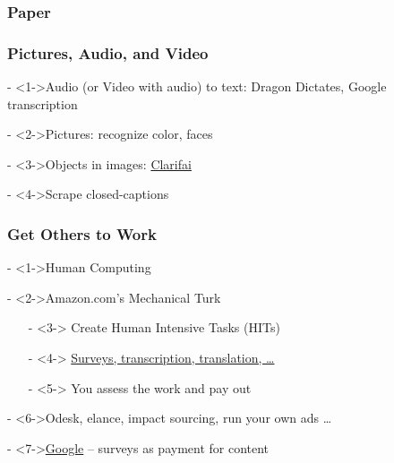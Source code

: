 \documentclass[compress, black]{beamer}
\begin{document}
\begin{frame}
\frametitle{Paper}
\end{frame}

\begin{frame}
\frametitle{Pictures, Audio, and Video}
	\begin{large_enum}
		\item[-]<1->Audio (or Video with audio) to text: Dragon Dictates, Google transcription 
		\item[-]<2->Pictures: recognize color, faces 
		\item[-]<3->Objects in images: \href{clarifai.com}{Clarifai}
		\item[-]<4->Scrape closed-captions
	\end{large_enum}
\end{frame}

\begin{frame}
\frametitle{Get Others to Work}
	\begin{large_enum}
		\item[-]<1->Human Computing
		\item[-]<2->Amazon.com's Mechanical Turk
			\begin{enumerate}
				\item[-]<3-> Create Human Intensive Tasks (HITs)
				\item[-]<4-> \href{https://www.mturk.com/mturk/findhits?match=false}{Surveys, transcription, translation, \ldots}
				\item[-]<5-> You assess the work and pay out 
			\end{enumerate}
		\item[-]<6->Odesk, elance, impact sourcing, run your own ads \ldots
		\item[-]<7->\href{http://www.google.com/insights/consumersurveys/home}{Google} -- surveys as payment for content
\end{large_enum}

\end{frame}
\end{document}
